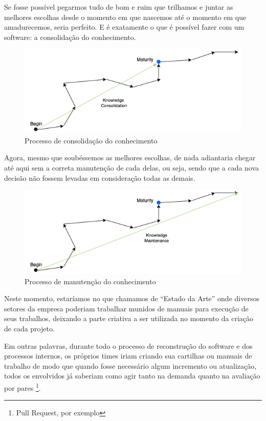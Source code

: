 \documentclass[a4paper]{article}
\begin{document}
Se fosse possível pegarmos tudo de bom e ruim que trilhamos e juntar as melhores escolhas desde o momento em que nascemos até o momento em que amadurecemos, seria perfeito. E é exatamente o que é possível fazer com um software: a consolidação do conhecimento. 

\begin{figure}[H]
    \centering
    \includegraphics[scale=0.60,keepaspectratio=true]{images/03.png}
    \caption{Processo de consolidação do conhecimento}
    \label{knwledge_consolidation}
\end{figure}

Agora, mesmo que soubéssemos as melhores escolhas, de nada adiantaria chegar até aqui sem a correta manutenção de cada delas, ou seja, sendo que a cada nova decisão não fossem levadas em consideração todas as demais.

\begin{figure}[H]
    \centering
    \includegraphics[scale=0.60,keepaspectratio=true]{images/04.png}
    \caption{Processo de manutenção do conhecimento}
    \label{knowledge_maintenance}
\end{figure}

Neste momento, estaríamos no que chamamos de ``Estado da Arte'' onde diversos setores da empresa poderiam trabalhar munidos de manuais para execução de seus trabalhos, deixando a parte criativa a ser utilizada no momento da criação de cada projeto. 

Em outras palavras, durante todo o processo de reconstrução do software e dos processos internos, os próprios times iriam criando sua cartilhas ou manuais de trabalho de modo que quando fosse necessário algum incremento ou atualização, todos os envolvidos já saberiam como agir tanto na demanda quanto na avaliação por pares \footnote{Pull Request, por exemplo}.
\end{document}
